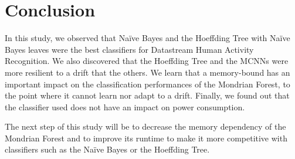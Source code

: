 \section{Conclusion}
In this study, we observed that Naïve Bayes and the Hoeffding Tree with Naïve
Bayes leaves were the best classifiers for Datastream Human Activity
Recognition.  We also discovered that the Hoeffding Tree and the MCNNs were
more resilient to a drift that the others.  We learn that a memory-bound has an
important impact on the classification performances of the Mondrian Forest,
to the point where it cannot learn nor adapt to a drift.  Finally, we found out
that the classifier used does not have an impact on power consumption.

The next step of this study will be to decrease the memory dependency of the
Mondrian Forest and to improve its runtime to make it more competitive with
classifiers such as the Naïve Bayes or the Hoeffding Tree.
